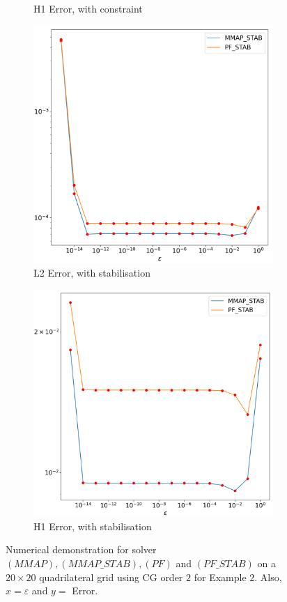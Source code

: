 \documentclass[12pt]{ociamthesis}
\begin{document}
\begin{figure}[H]
\begin{subfigure}{0.42\textwidth}
     \caption{H1 Error, with constraint} \label{E2_LH_H1_CON}
 \end{subfigure}
 \begin{subfigure}{0.42\textwidth}
     \includegraphics[width=\textwidth]{Pics/LHSims/E2/E2_STABL2.png}
     \caption{L2 Error, with stabilisation} \label{E2_LH_L2_STAB}
 \end{subfigure}
 \hfill
 \begin{subfigure}{0.42\textwidth}
     \includegraphics[width=\textwidth]{Pics/LHSims/E2/E2_STABH1.png}
     \caption{H1 Error, with stabilisation} \label{E2_LH_H1_STAB}
 \end{subfigure}
 \caption{Numerical demonstration for solver $(MMAP), (MMAP\_STAB), (PF)$ and $(PF\_STAB)$ on a $20\times 20$ quadrilateral grid using CG order $2$ for Example $2$. Also, $x=\varepsilon$ and $y=$ Error.} \label{E2_LH}
\end{figure}
\end{document}
